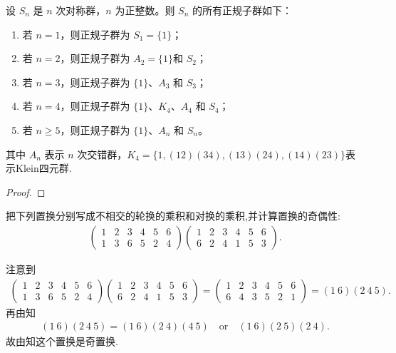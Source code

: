\documentclass[../../main.tex]{subfiles}%
\begin{document}
\begin{proposition}\label{proposition:对称群正规子群的分类}
设 \(S_n\) 是 \(n\) 次对称群，\(n\) 为正整数。则 \(S_n\) 的所有正规子群如下：
\begin{enumerate}[(1)]
\item 若 \(n = 1\)，则正规子群为 \(S_1=\{1\}\)；

\item 若 \(n = 2\)，则正规子群为 \(A_2=\{1\}\)和 \(S_2\)；

\item 若 \(n = 3\)，则正规子群为 \(\{1\}\)、\(A_3\) 和 \(S_3\)；

\item 若 \(n = 4\)，则正规子群为 \(\{1\}\)、\(K_4\)、\(A_4\) 和 \(S_4\)；

\item 若 \(n \geqslant 5\)，则正规子群为 \(\{1\}\)、\(A_n\) 和 \(S_n\)。
\end{enumerate}
其中 \(A_n\) 表示 \(n\) 次交错群，\(K_4 = \{1, (12)(34), (13)(24), (14)(23)\}\)表示Klein四元群.
\end{proposition}
\begin{proof}

\end{proof}

\begin{example}
把下列置换分别写成不相交的轮换的乘积和对换的乘积,并计算置换的奇偶性:
\begin{align*}
\begin{pmatrix}
1&2&3&4&5&6\\
1&3&6&5&2&4
\end{pmatrix}
\begin{pmatrix}
1&2&3&4&5&6\\
6&2&4&1&5&3
\end{pmatrix}.
\end{align*}
\end{example}
\begin{solution}
注意到
\begin{align*}
\begin{pmatrix}
1&2&3&4&5&6\\
1&3&6&5&2&4
\end{pmatrix}
\begin{pmatrix}
1&2&3&4&5&6\\
6&2&4&1&5&3
\end{pmatrix}
=
\begin{pmatrix}
1&2&3&4&5&6\\
6&4&3&5&2&1
\end{pmatrix}
=
(1\ 6)(2\ 4\ 5).
\end{align*}
再由知
\begin{align*}
(1\ 6)(2\ 4\ 5)=(1\ 6)(2\ 4)(4\ 5)\quad \text{or}\quad (1\ 6)(2\ 5)(2\ 4).
\end{align*}
故由知这个置换是奇置换.

\end{solution}
\end{document}

